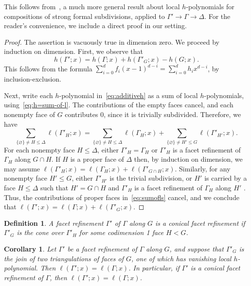 \documentclass[10pt]{amsart}
\newtheorem{coro}[theorem]{Corollary}
\newtheorem{defi}[theorem]{Definition}
\begin{document}
\noindent This follows from~\cite[Corollary~4.7]{KatzStapledon16}, a much more general result about local $h$-polynomials for compositions of strong formal subdivisions, applied to $\Gamma' \to \Gamma \to \Delta$. For the reader's convenience, we include a direct proof in our setting.

\begin{proof}
The assertion is vacuously true in dimension zero. We proceed by induction on dimension. First, we observe that
\begin{equation}
\label{eq:additiveh} h(\Gamma';x) = h(\Gamma;x) + h(\Gamma'_G;x) - h(G;x).
\end{equation}
This follows from the formula $\sum_{i = 0}^d f_i (x-1)^{d-i} = \sum_{i=0}^d h_i x^{d-i}$, by inclusion-exclusion. 

Next, write each $h$-polynomial in~\eqref{eq:additiveh} as a sum of local $h$-polynomials, using~\eqref{eq:h=sum-of-l}. The contributions of the empty faces cancel, and each nonempty face of $G$ contributes 0, since it is trivially subdivided. Therefore, we have
\begin{equation} \label{eq:sumofls}
\sum_{\{\varnothing\} \neq H \leq \Delta} \ell(\Gamma'_H;x) = \sum_{\{\varnothing\} \neq H \leq \Delta} \ell(\Gamma_H;x) + \sum_{\{\varnothing\} \neq H' \leq G} \ell(\Gamma'_{H'};x).
\end{equation}
For each nonempty face $H \leq \Delta$, either $\Gamma'_H = \Gamma_H$ or $\Gamma'_H$ is a facet refinement of $\Gamma_H$ along $G \cap H$. If $H$ is a proper face of $\Delta$ then, by induction on dimension, we may assume $\ell(\Gamma'_H;x) = \ell(\Gamma_H;x) + \ell(\Gamma'_{G \cap H};x)$. Similarly, for any nonempty face $H' \leq G$, either $\Gamma'_{H'}$ is the trivial subdivision, or $H'$ is carried by a face $H \leq \Delta$ such that $H' = G \cap H$ and $\Gamma'_H$ is a facet refinement of $\Gamma_H$ along $H'$ . Thus, the contributions of proper faces in~\eqref{eq:sumofls} cancel, and we conclude that $\ell(\Gamma';x) = \ell(\Gamma;x) + \ell(\Gamma'_G;x)$.
\end{proof}


\begin{defi}
A facet refinement $\Gamma'$ of $\Gamma$ along $G$ is a \emph{conical facet refinement} if $\Gamma'_G$ is the cone over $\Gamma'_H$ for some codimension 1 face $H < G$.
\end{defi}

\begin{coro} \label{cor:nfacetjoin}
Let $\Gamma'$ be a facet refinement of $\Gamma$ along $G$, and suppose that $\Gamma'_G$ is the join of two triangulations of faces of $G$, one of which has vanishing local $h$-polynomial. Then $\ell(\Gamma';x) = \ell(\Gamma;x)$. In particular, if $\Gamma'$ is a conical facet refinement of $\Gamma$, then $\ell(\Gamma';x) = \ell(\Gamma;x)$. 
\end{coro}
\end{document}
